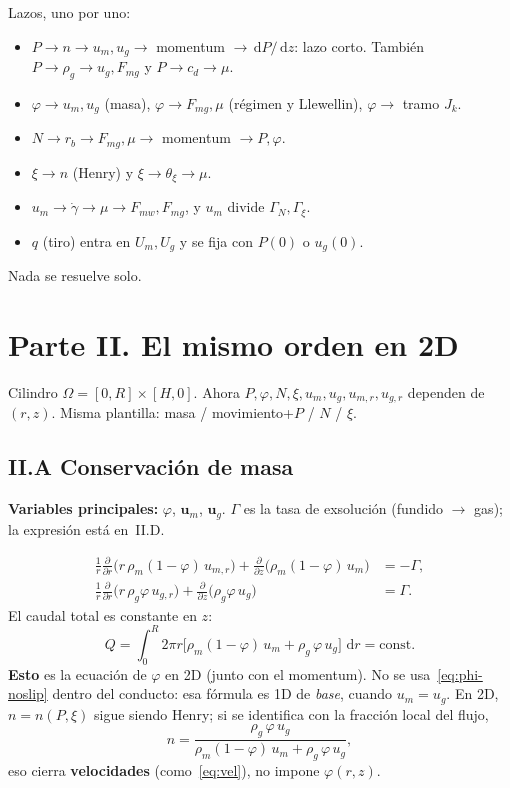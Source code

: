 \documentclass[11pt,a4paper]{article}
\newcommand{\dd}{\,\mathrm{d}}
\newcommand{\p}{\partial}
\begin{document}
Lazos, uno por uno:
\begin{itemize}
\item $P\to n\to u_m,u_g\to$ momentum $\to\dd P/\dd z$: lazo
  corto. También $P\to\rho_g\to u_g,F_{mg}$ y $P\to c_d\to\mu$.
\item $\varphi\to u_m,u_g$ (masa), $\varphi\to F_{mg},\mu$
  (régimen y Llewellin), $\varphi\to$ tramo $J_k$.
\item $N\to r_b\to F_{mg},\mu\to$ momentum $\to P,\varphi$.
\item $\xi\to n$ (Henry) y $\xi\to\theta_\xi\to\mu$.
\item $u_m\to\dot\gamma\to\mu\to F_{mw},F_{mg}$, y
  $u_m$ divide $\Gamma_N,\Gamma_\xi$.
\item $q$ (tiro) entra en $U_m,U_g$ y se fija con $P(0)$ o
  $u_g(0)$.
\end{itemize}
Nada se resuelve solo.

\section*{Parte II. El mismo orden en 2D}

Cilindro $\Omega=[0,R]\times[H,0]$. Ahora
$P,\varphi,N,\xi,u_m,u_g,u_{m,r},u_{g,r}$ dependen de $(r,z)$.
Misma plantilla: masa / movimiento+$P$ / $N$ / $\xi$.

\subsection*{II.A Conservación de masa}

\textbf{Variables principales:} $\varphi$, $\mathbf{u}_m$,
$\mathbf{u}_g$. $\Gamma$ es la tasa de exsolución
(fundido $\to$ gas); la expresión está en~II.D.

\begin{align}
\label{eq:masa-m}
\frac{1}{r}\frac{\p}{\p r}\bigl(r\,\rho_m(1-\varphi)\,u_{m,r}\bigr)
+\frac{\p}{\p z}\bigl(\rho_m(1-\varphi)\,u_m\bigr)
&=-\Gamma,
\\
\label{eq:masa-g}
\frac{1}{r}\frac{\p}{\p r}\bigl(r\,\rho_g\varphi\,u_{g,r}\bigr)
+\frac{\p}{\p z}\bigl(\rho_g\varphi\,u_g\bigr)
&=\Gamma.
\end{align}
El caudal total es constante en $z$:
\begin{equation}
\label{eq:Q}
Q
=\int_0^R 2\pi r\bigl[
\rho_m(1-\varphi)\,u_m+\rho_g\,\varphi\,u_g
\bigr]\,\dd r
=\mathrm{const}.
\end{equation}
\textbf{Esto} es la ecuación de $\varphi$ en 2D (junto con el
momentum). No se usa~\eqref{eq:phi-noslip} dentro del
conducto: esa fórmula es 1D de \emph{base}, cuando
$u_m=u_g$. En 2D, $n=n(P,\xi)$ sigue siendo Henry; si se
identifica con la fracción local del flujo,
\begin{equation}
\label{eq:n-loc}
n
=\frac{\rho_g\,\varphi\,u_g}
{\rho_m(1-\varphi)\,u_m+\rho_g\,\varphi\,u_g},
\end{equation}
eso cierra \textbf{velocidades} (como~\eqref{eq:vel}), no
impone $\varphi(r,z)$.
\end{document}
